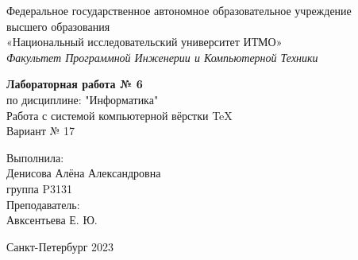\begin{center}
\large
Федеральное государственное автономное образовательное учреждение\\ 
высшего образования\\
«Национальный исследовательский университет ИТМО»\\
\textit{Факультет Программной Инженерии и Компьютерной Техники}\\ 
\end{center}

\vspace{3cm}
\begin{center}
    \LARGE
    \textbf{Лабораторная работа № 6}\\
    по дисциплине: "Информатика"\\
    Работа с системой компьютерной вёрстки \TeX \\
    \vspace{1cm}
    Вариант № 17
\end{center}
\vspace{9cm}
\begin{flushright}
    Выполнила:\\
    Денисова Алёна Александровна\\
    группа P3131\\
    Преподаватель: \\
    Авксентьева Е. Ю.\\
\end{flushright}
\vspace{2cm}
\begin{center}
    Санкт-Петербург 2023
\end{center}